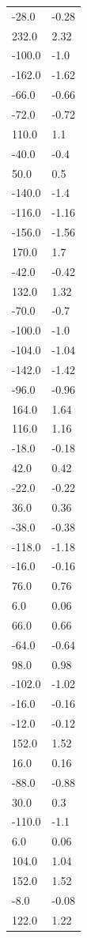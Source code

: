 \begin{longtable}{ll}
-28.0 & -0.28 \\
232.0 & 2.32 \\
-100.0 & -1.0 \\
-162.0 & -1.62 \\
-66.0 & -0.66 \\
-72.0 & -0.72 \\
110.0 & 1.1 \\
-40.0 & -0.4 \\
50.0 & 0.5 \\
-140.0 & -1.4 \\
-116.0 & -1.16 \\
-156.0 & -1.56 \\
170.0 & 1.7 \\
-42.0 & -0.42 \\
132.0 & 1.32 \\
-70.0 & -0.7 \\
-100.0 & -1.0 \\
-104.0 & -1.04 \\
-142.0 & -1.42 \\
-96.0 & -0.96 \\
164.0 & 1.64 \\
116.0 & 1.16 \\
-18.0 & -0.18 \\
42.0 & 0.42 \\
-22.0 & -0.22 \\
36.0 & 0.36 \\
-38.0 & -0.38 \\
-118.0 & -1.18 \\
-16.0 & -0.16 \\
76.0 & 0.76 \\
6.0 & 0.06 \\
66.0 & 0.66 \\
-64.0 & -0.64 \\
98.0 & 0.98 \\
-102.0 & -1.02 \\
-16.0 & -0.16 \\
-12.0 & -0.12 \\
152.0 & 1.52 \\
16.0 & 0.16 \\
-88.0 & -0.88 \\
30.0 & 0.3 \\
-110.0 & -1.1 \\
6.0 & 0.06 \\
104.0 & 1.04 \\
152.0 & 1.52 \\
-8.0 & -0.08 \\
122.0 & 1.22 \\

\end{longtable}
